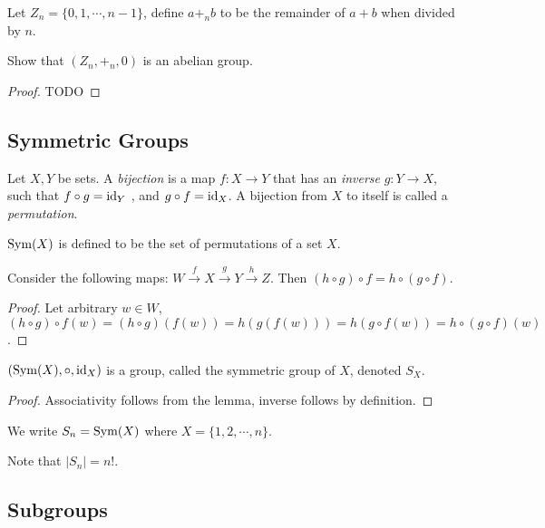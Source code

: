 \documentclass[12pt]{article}
\begin{document}
Let $Z_n = \{0,1,\cdots,n-1\}$, define $a +_{n} b$ to be the remainder
of $a + b$ when divided by $n$.

\begin{exercise}
    Show that $(Z_n, +_{n}, 0)$ is an abelian group.
\end{exercise}
\begin{proof}
    TODO
\end{proof}

\subsection*{Symmetric Groups}

\begin{definition}
    Let $X,Y$ be sets. A \emph{bijection} is a
    map $f:X\to Y$ that has an \emph{inverse} $g:Y\to X$,
    such that $f \circ g = \operatorname{id}_{Y}$ , and $g \circ f = \operatorname{id}_{X}$.
    A bijection from $X$ to itself is called a \emph{permutation}.
\end{definition}

\begin{definition}
    $\operatorname{Sym}(X)$ is defined to be the set of permutations of a set $X$.
\end{definition}

\begin{lemma}
    Consider the following maps: $W \stackrel f{\to} X \stackrel g\to Y \stackrel h\to Z$. Then $(h \circ g) \circ f = h \circ (g \circ f)$.
\end{lemma}
\begin{proof}
    Let arbitrary $w \in W$,
    $(h\circ g)\circ f (w) = (h\circ g)(f(w)) = h(g(f(w))) = h(g \circ f(w)) = h\circ(g\circ f)(w)$.
\end{proof}

\begin{prop}
    $(\operatorname{Sym}(X),\circ,\operatorname{id}_{X})$ is a group, 
    called the symmetric group of $X$, denoted $S_X$.
\end{prop}
\begin{proof}
    Associativity follows from the lemma,
    inverse follows by definition.
\end{proof}

\begin{definition}
    We write $S_n = \operatorname{Sym}(X)$ where $X = \{1,2,\cdots,n\}$.
\end{definition}

Note that $|S_n| = n!$.

\subsection{Subgroups}
\end{document}
